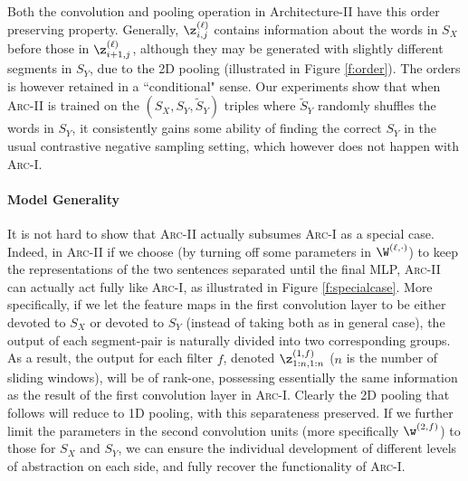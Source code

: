 \documentclass{article} %
\begin{document}
Both the convolution and pooling operation in Architecture-II have this order preserving property. Generally, $\z^{(\ell)}_{i,j}$ contains information about the words in $S_X$ before those in $\z^{(\ell)}_{i+1,j}$,  although they may be generated with slightly different segments in $S_Y$, due to the 2D pooling (illustrated in Figure \ref{f:order}). The orders is however retained in a ``conditional" sense. Our experiments show that when \textsc{Arc-II} is trained on the $(S_X, S_Y, \tilde{S}_Y)$ triples where $\tilde{S}_Y$ randomly shuffles the words in $S_Y$, it consistently gains some ability of finding the correct $S_Y$ in the usual contrastive negative sampling setting, which however does not happen with \textsc{Arc-I}. \vspace{-5pt}



\paragraph{Model Generality} It is not hard to show that \textsc{Arc-II} actually subsumes \textsc{Arc-I} as a special case. Indeed, in \textsc{Arc-II} if we choose (by turning off some parameters in $\W^{(\ell,\cdot)}$) to keep the representations of the two sentences separated until the final MLP, \textsc{Arc-II} can actually act fully like \textsc{Arc-I}, as illustrated in Figure \ref{f:specialcase}. More specifically, if we let the feature maps in the first convolution layer to be either devoted to $S_X$ or devoted to $S_Y$ (instead of taking both as in general case), the output of each segment-pair is naturally divided into two corresponding groups. As a result, the output for each filter $f$, denoted $\z^{(1, f)}_{1:n,1:n}$ ($n$ is the number of sliding windows), will be of rank-one, possessing essentially the same information as the result of the first convolution layer in \textsc{Arc-I}. Clearly the 2D pooling that follows will reduce to 1D pooling, with this separateness preserved. If we further limit the parameters in the second convolution units (more specifically $\w^{(2,f)}$) to those for $S_X$ and $S_Y$, we can ensure the individual  development of different levels of abstraction on each side, and fully recover the functionality of \textsc{Arc-I}.
\end{document}
